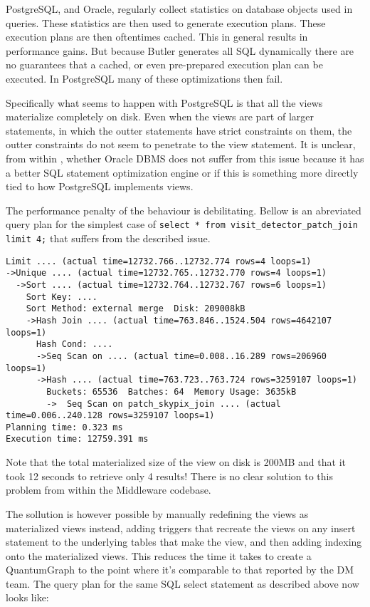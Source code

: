 PostgreSQL, and Oracle, regularly collect statistics on database objects used in queries. These statistics are then used to generate execution plans. These execution plans are then oftentimes cached. This in general results in performance gains. But because Butler generates all SQL dynamically there are no guarantees that a cached, or even pre-prepared execution plan can be executed. In PostgreSQL many of these optimizations then fail.

Specifically what seems to happen with PostgreSQL is that all the views materialize completely on disk. Even when the views are part of larger statements, in which the outter statements have strict constraints on them, the outter constraints do not seem to penetrate to the view statement. It is unclear, from within \poc, whether Oracle DBMS does not suffer from this issue because it has a better SQL statement optimization engine or if this is something more directly tied to how PostgreSQL implements views. 

The performance penalty of the behaviour is debilitating. Bellow is an abreviated query plan for the simplest case of \lstinline[basicstyle=\ttfamily]{select * from visit_detector_patch_join limit 4;} that suffers from the described issue.

\begin{lstlisting}[style=sqlprompt]
Limit .... (actual time=12732.766..12732.774 rows=4 loops=1)
->Unique .... (actual time=12732.765..12732.770 rows=4 loops=1)
  ->Sort .... (actual time=12732.764..12732.767 rows=6 loops=1)
    Sort Key: ....
    Sort Method: external merge  Disk: 209008kB
    ->Hash Join .... (actual time=763.846..1524.504 rows=4642107 loops=1)
      Hash Cond: ....
      ->Seq Scan on .... (actual time=0.008..16.289 rows=206960 loops=1)
      ->Hash .... (actual time=763.723..763.724 rows=3259107 loops=1)
        Buckets: 65536  Batches: 64  Memory Usage: 3635kB
        ->  Seq Scan on patch_skypix_join .... (actual time=0.006..240.128 rows=3259107 loops=1)
Planning time: 0.323 ms
Execution time: 12759.391 ms
\end{lstlisting}

Note that the total materialized size of the view on disk is 200MB and that it took 12 seconds to retrieve only 4 results! There is no clear solution to this problem from within the Middleware codebase. 

The sollution is however possible by manually redefining the views as materialized views instead, adding triggers that recreate the views on any insert statement to the underlying tables that make the view, and then adding indexing onto the materialized views. This reduces the time it takes to create a QuantumGraph to the point where it's comparable to that reported by the DM team. The query plan for the same SQL select statement as described above now looks like:

